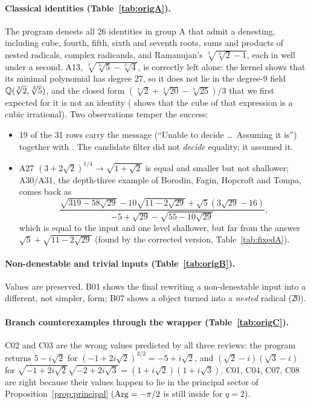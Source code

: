 \paragraph{Classical identities (Table~\ref{tab:origA}).}
The program denests all 26 identities in group A that admit a denesting,
including cube, fourth, fifth, sixth and seventh roots, sums and products of
nested radicals, complex radicands, and Ramanujan's $\sqrt[3]{\sqrt[3]2-1}$,
each in well under a second. A13, $\sqrt[3]{\sqrt[3]5-\sqrt[3]4}$, is correctly
left alone: the kernel shows that its minimal polynomial has degree 27, so it
does not lie in the degree-9 field $\mathbb{Q}(\sqrt[3]2,\sqrt[3]5)$, and the closed
form $(\sqrt[3]2+\sqrt[3]{20}-\sqrt[3]{25})/3$ that we first expected for it is
not an identity ( shows that the cube of that expression is a
cubic irrational). Two observations temper the success:
\begin{itemize}
\item 19 of the 31 rows carry the message 
      (``Unable to decide \ldots\ Assuming it is'') together with
      . The candidate filter did not \emph{decide} equality; it
      assumed it.
\item A27 $(3+2\sqrt2)^{1/4}\to\sqrt{1+\sqrt2}$ is equal and smaller but not
      shallower; A30/A31, the depth-three example of Borodin, Fagin, Hopcroft
      and Tompa, comes back as
      \[
      \frac{\sqrt{319-58\sqrt{29}}-10\sqrt{11-2\sqrt{29}}+\sqrt5(3\sqrt{29}-16)}
           {-5+\sqrt{29}-\sqrt{55-10\sqrt{29}}},
      \]
      which is equal to the input and one level shallower, but far from the
      answer $\sqrt5+\sqrt{11-2\sqrt{29}}$ (found by the corrected version,
      Table~\ref{tab:fixedA}).
\end{itemize}


\paragraph{Non-denestable and trivial inputs (Table~\ref{tab:origB}).}
Values are preserved. B01 shows the final  rewriting a
non-denestable input into a different, not simpler, form; B07 shows a
 object turned into a \emph{nested} radical (\U{20}).


\paragraph{Branch counterexamples through the wrapper (Table~\ref{tab:origC}).}
C02 and C03 are the wrong values predicted by all three reviews: the program
returns $5-i\sqrt2$ for $(-1+2i\sqrt2)^{3/2}=-5+i\sqrt2$, and
$(\sqrt2-i)(\sqrt3-i)$ for $\sqrt{-1+2i\sqrt2}\sqrt{-2+2i\sqrt3}=(1+i\sqrt2)(1+i\sqrt3)$.
C01, C04, C07, C08 are right because their values happen to lie in the
principal sector of Proposition~\ref{prop:principal}
($\operatorname{Arg}=-\pi/2$ is still inside for $q=2$).


